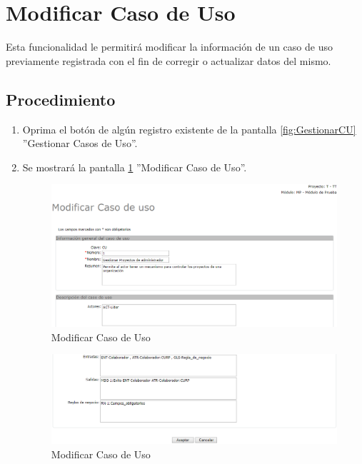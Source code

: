 \hypertarget{cv:modificarCU}{\section{Modificar Caso de Uso}} \label{sec:modificarCU}

	Esta funcionalidad le permitirá modificar la información de un caso de uso previamente registrada con el fin de corregir o actualizar datos del mismo. 

		\subsection{Procedimiento}

			\begin{enumerate}
	
			\item Oprima el botón \IUEditar{} de algún registro existente de la pantalla \ref{fig:GestionarCU} ''Gestionar Casos de Uso''.
	
			\item Se mostrará la pantalla \ref{fig:modificarCUA} ''Modificar Caso de Uso''.
			
			\begin{figure}[H]
				\begin{center}
					\includegraphics[scale=0.5]{roles/lider/casosUso/pantallas/IU12-2modificarCUA}
					\caption{Modificar Caso de Uso}
					\label{fig:modificarCUA}
				\end{center}
			\end{figure}
		
			\begin{figure}[H]
				\begin{center}
					\includegraphics[scale=0.6]{roles/lider/casosUso/pantallas/IU12-2modificarCUB}
					\caption{Modificar Caso de Uso}
					\label{fig:modificarCUB}
				\end{center}
			\end{figure}
		

\end{enumerate}
